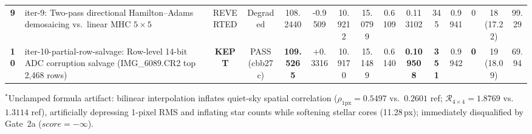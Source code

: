 \documentclass[10pt,twocolumn,letterpaper]{article}
\DeclareRobustCommand{\code}[1]{\texttt{#1}}
\def\code#1{#1}%
\begin{document}
\begin{table}[t]
{\begin{tabular}{clccccccccccccc}
      \textbf{9} & \code{iter-9}: Two-pass directional Hamilton--Adams demosaicing vs.\ linear MHC $5\times 5$ & REVERTED & Degraded & \code{108.2440} & \code{-0.9509} & \code{10.9212} & \code{15.0799} & \code{0.6109} & \code{0.113102} & \code{345} & \code{0.9941} & \code{0} & \code{18 (17.22)} & \code{99.29} \\
      \textbf{10} & \code{iter-10-partial-row-salvage}: Row-level 14-bit ADC corruption salvage (\code{IMG\_6089.CR2} top 2,468 rows) & \textbf{KEPT} & \code{PASS (cbb27c)} & \textbf{\code{109.5265}} & \code{+0.3316} & \code{10.9170} & \code{15.1489} & \code{0.6140} & \textbf{\code{0.109508}} & \textbf{\code{351}} & \code{0.9942} & \textbf{\code{0}} & \code{19 (18.09)} & \code{69.94} \\
      \bottomrule
    \end{tabular}%
  }
  \vspace{0.2em}
  \parbox{\textwidth}{\footnotesize $^*$Unclamped formula artifact: bilinear interpolation inflates quiet-sky spatial correlation ($\rho_{1\text{px}} = 0.5497$ vs.\ $0.2601$ ref; $\mathcal{R}_{4\times 4} = 1.8769$ vs.\ $1.3114$ ref), artificially depressing 1-pixel RMS and inflating star counts while softening stellar cores (\code{11.28\,px}); immediately disqualified by Gate~2a ($\code{score} = -\infty$).}
\end{table}
\end{document}
